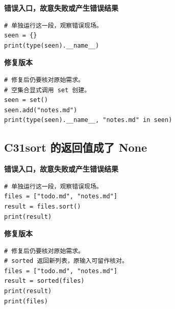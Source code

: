 



\textbf{错误入口，故意失败或产生错误结果}

\begin{lstlisting}[style=errorcode,title={错误复现（故意失败或错误结果）：\code{case_30_bad.py.txt}}]
# 单独运行这一段，观察错误现场。
seen = {}
print(type(seen).__name__)
\end{lstlisting}

\textbf{修复版本}

\begin{lstlisting}[title={\code{case_30.py}}]
# 修复后仍要核对原始需求。
# 空集合显式调用 set 创建。
seen = set()
seen.add("notes.md")
print(type(seen).__name__, "notes.md" in seen)
\end{lstlisting}


\subsection*{C31\enspace sort 的返回值成了 None}





\textbf{错误入口，故意失败或产生错误结果}

\begin{lstlisting}[style=errorcode,title={错误复现（故意失败或错误结果）：\code{case_31_bad.py.txt}}]
# 单独运行这一段，观察错误现场。
files = ["todo.md", "notes.md"]
result = files.sort()
print(result)
\end{lstlisting}

\textbf{修复版本}

\begin{lstlisting}[title={\code{case_31.py}}]
# 修复后仍要核对原始需求。
# sorted 返回新列表，原输入可留作核对。
files = ["todo.md", "notes.md"]
result = sorted(files)
print(result)
print(files)
\end{lstlisting}

